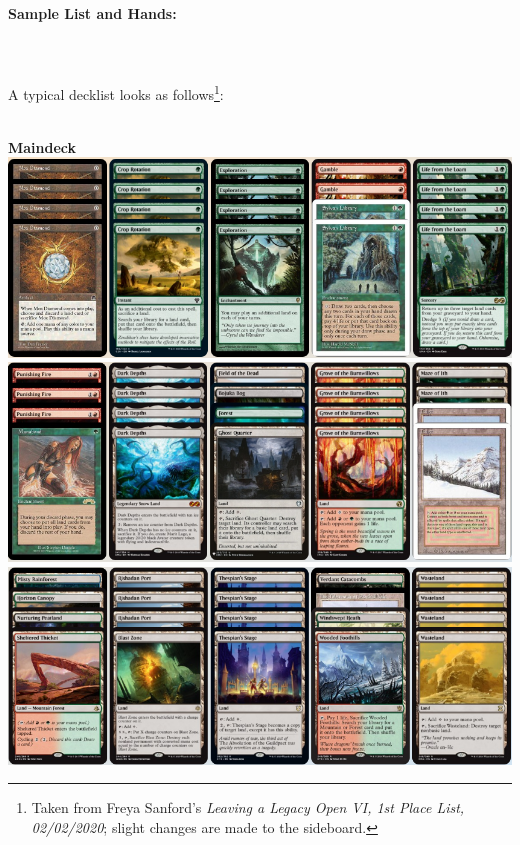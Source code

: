 \documentclass{report}
\begin{document}
\paragraph{Sample List and Hands:\\\\\\}
A typical decklist looks as follows\footnote{Taken from Freya Sanford's \emph{Leaving a Legacy Open VI, 1st Place List, 02/02/2020}; slight changes are made to the sideboard.}:\\\\
\begin{center}
\textbf{Maindeck}
\includegraphics [width =\textwidth] {rgdecklist1}
\includegraphics [width =\textwidth] {rgdecklist2}
\includegraphics [width =\textwidth] {rgdecklist3}
\end{center}
\end{document}
